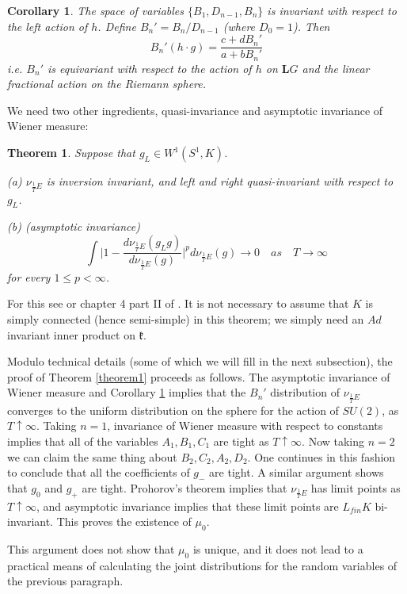 \documentclass{amsart}
\newtheorem{theorem}{Theorem}[section]
\newtheorem{corollary}{Corollary}
\theoremstyle{conjecture}
\theoremstyle{definition}
\theoremstyle{question}
\theoremstyle{questions}
\theoremstyle{remark}
\theoremstyle{remarks}
\theoremstyle{example}
\numberwithin{equation}{section}
\begin{document}
\begin{corollary}\label{corollary1}The space of variables $\{B_1,D_{n-1},B_n\}$ is invariant with respect to the left action of $h$.
Define $B_n'=B_n/D_{n-1}$ (where $D_0=1$). Then
$$B_n'(h\cdot g)=\frac{c+dB_n'}{a+bB_n'}$$
i.e. $B_n'$ is equivariant with respect to the action of $h$ on $\mathbf LG$ and the linear fractional
action on the Riemann sphere.
\end{corollary}

We need two other ingredients, quasi-invariance and asymptotic invariance of Wiener measure:


\begin{theorem}Suppose that $g_L\in W^1(S^1,K)$. 

(a) $\nu_{\frac 1T E}$ is inversion invariant, and left and right quasi-invariant with respect to $g_L$.

(b) (asymptotic invariance) 
$$\int\vert 1-\frac {d\nu_{\frac 1T E}(g_Lg)}{d\nu_{\frac 1T E}
(g)}\vert^pd\nu_{\frac 1T E}(g)\to 0\quad as\quad T \to \infty$$
for every $1\le p<\infty$. \end{theorem}

For this see \cite{MM2} or chapter 4 part II of \cite{Pi1}. It is not necessary to assume that $K$ is simply connected 
(hence semi-simple) in this theorem; we simply need an $Ad$ invariant inner product on $\mathfrak k$.

Modulo technical details (some of which we will fill in the next subsection), the proof of Theorem \ref{theorem1} proceeds as follows. The asymptotic invariance of Wiener measure
and Corollary \ref{corollary1} implies that the $B_n'$ distribution of $\nu_{\frac 1T E}$ converges to the uniform
distribution on the sphere for the action of $SU(2)$, as $T\uparrow \infty$. Taking $n=1$, invariance of Wiener measure with respect to constants implies
that all of the variables $A_1,B_1,C_1$ are tight as $T\uparrow \infty$. Now taking $n=2$ we can claim the same thing about $B_2,C_2,A_2,D_2$. One continues
in this fashion to conclude that all the coefficients of $g_-$ are tight. A similar argument shows that $g_0$ and $g_+$ are tight.
Prohorov's theorem implies that $\nu_{\frac 1T E}$ has limit points as $T\uparrow \infty$, and asymptotic invariance implies that these limit points
are $L_{fin}K$ bi-invariant. This proves the existence of $\mu_0$. 

This argument does not show that $\mu_0$ is unique, and it does not lead to a practical means of calculating the joint distributions for
the random variables of the previous paragraph.
\end{document}
